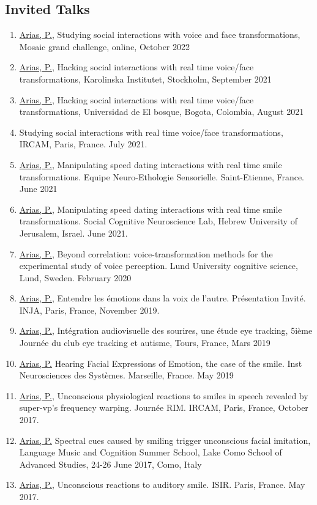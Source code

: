 \documentclass[a4paper, 11pt]{article}
\begin{document}
\subsection*{Invited Talks}
\begin{enumerate}
	\item \ul{Arias, P.}, Studying social interactions with voice and face transformations, Mosaic grand challenge, online, October 2022
	\item \ul{Arias, P.}, Hacking social interactions with real time voice/face transformations, Karolinska Institutet, Stockholm, September 2021
	\item \ul{Arias, P.}, Hacking social interactions with real time voice/face transformations, Universidad de El bosque, Bogota, Colombia, August 2021
	\item Studying social interactions with real time voice/face transformations, IRCAM, Paris, France. July 2021.
	\item \ul{Arias, P.}, Manipulating speed dating interactions with real time smile transformations. Equipe Neuro-Ethologie Sensorielle. Saint-Etienne, France. June 2021
	\item \ul{Arias, P.}, Manipulating speed dating interactions with real time smile transformations. Social Cognitive Neuroscience Lab, Hebrew University of Jerusalem, Israel. June 2021. 
	\item \ul{Arias, P.}, Beyond correlation: voice-transformation methods for the experimental study of voice perception. Lund University cognitive science, Lund, Sweden. February 2020
	\item \ul{Arias, P.}, Entendre les émotions dans la voix de l'autre. Présentation Invité. INJA, Paris, France, November 2019.
	\item \ul{Arias, P.}, Intégration audiovisuelle des sourires, une étude eye tracking, 5ième Journée du club eye tracking et autisme, Tours, France, Mars 2019	
	\item \ul{Arias, P.} Hearing Facial Expressions of Emotion, the case of the smile. Inst Neurosciences des Systèmes. Marseille, France. May 2019
	\item \ul{Arias, P.}, Unconscious physiological reactions to smiles in speech revealed by super-vp’s frequency warping. Journée RIM. IRCAM, Paris, France, October 2017.
	\item \ul{Arias, P.} Spectral cues caused by smiling trigger unconscious facial imitation, Language Music and Cognition Summer School, Lake Como School of Advanced Studies, 24-26 June 2017, Como, Italy
	\item \ul{Arias, P.}, Unconscious reactions to auditory smile. ISIR. Paris, France. May 2017.


\end{enumerate}	
\end{document}
